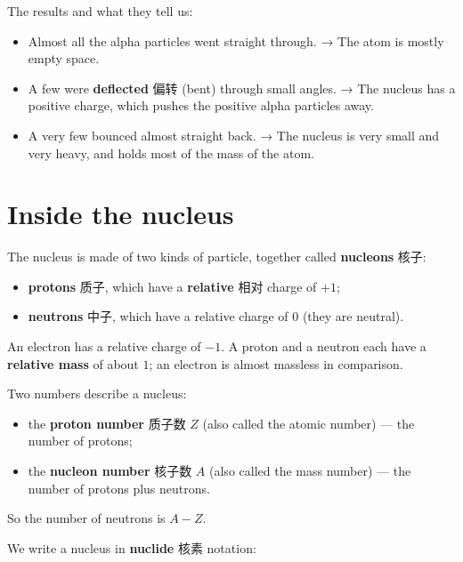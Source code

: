 \documentclass[11pt]{article}
\begin{document}
The results and what they tell us:

\begin{itemize}
\item Almost all the alpha particles went straight through. → The atom is mostly empty space.

\item A few were \textbf{deflected} 偏转 (bent) through small angles. → The nucleus has a positive charge, which pushes the positive alpha particles away.

\item A very few bounced almost straight back. → The nucleus is very small and very heavy, and holds most of the mass of the atom.

\end{itemize}

\section*{Inside the nucleus}

The nucleus is made of two kinds of particle, together called \textbf{nucleons} 核子:

\begin{itemize}
\item \textbf{protons} 质子, which have a \textbf{relative} 相对 charge of $+1$;

\item \textbf{neutrons} 中子, which have a relative charge of $0$ (they are neutral).

\end{itemize}

An electron has a relative charge of $-1$. A proton and a neutron each have a \textbf{relative mass} of about $1$; an electron is almost massless in comparison.

Two numbers describe a nucleus:

\begin{itemize}
\item the \textbf{proton number} 质子数 $Z$ (also called the atomic number) — the number of protons;

\item the \textbf{nucleon number} 核子数 $A$ (also called the mass number) — the number of protons plus neutrons.

\end{itemize}

So the number of neutrons is $A - Z$.

We write a nucleus in \textbf{nuclide} 核素 notation:
\end{document}
